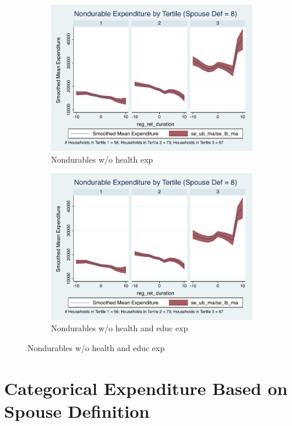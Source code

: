 \documentclass[11pt,onecolumn]{article}
\numberwithin{figure}{section}
\begin{document}
\begin{figure}
  \begin{subfigure}{0.5\textwidth}
  \centering
 	\includegraphics[width=0.9\linewidth]{../ConsumptionPostRetirement_by_SpouseDef/Smoothed_xhealth/spouse_def_8.pdf}
    \caption{Nondurables w/o health exp}
    \label{fig:chapter001_dist_001}
  \end{subfigure}
  	\hspace{1cm}
  \begin{subfigure}{0.5\textwidth}
 	\includegraphics[width=0.9\linewidth]{../ConsumptionPostRetirement_by_SpouseDef/Smoothed_xhealth_educ/spouse_def_8.pdf}
    \caption{Nondurables w/o health and educ exp}
    \label{fig:chapter001_reward_001}
  \end{subfigure}
\end{figure}
\clearpage

\section{Categorical Expenditure Based on Spouse Definition}
\end{document}
